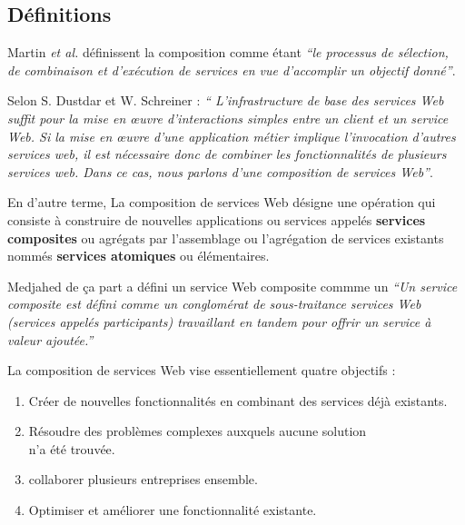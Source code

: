    \subsection{Définitions}
    \label{sec:definitions}

    Martin \emph{et al.} \cite{martin2004owl} définissent
    la composition comme étant \emph{``le processus de sélection, de
      combinaison et d'exécution de services en vue
      d'accomplir un objectif donné''}.

    Selon S. Dustdar et W. Schreiner \cite{dustdar2005survey} :
    \emph{`` L'infrastructure de base des services Web suffit pour la
      mise en œuvre d'interactions simples entre un client et un
      service Web. Si la mise en œuvre d'une application métier
      implique l'invocation d'autres services web, il est nécessaire
      donc de combiner les fonctionnalités de plusieurs services
      web. Dans ce cas, nous parlons d'une composition de services
      Web''}.

    En d'autre terme, La composition de services Web désigne une
    opération qui consiste à construire de nouvelles applications ou
    services appelés \textbf{services composites} ou agrégats par
    l'assemblage ou l'agrégation de services existants nommés
    \textbf{services atomiques} ou élémentaires.

    Medjahed \cite{medjahed2004thesis}de ça part a défini un service
    Web composite commme un \emph{``Un service composite est défini
      comme un conglomérat de sous-traitance services Web (services
      appelés participants) travaillant en tandem pour offrir un
      service à valeur ajoutée.''}

    La composition de services Web vise essentiellement quatre
    objectifs \cite{driss2011approche}:
    \begin{enumerate}
      \item Créer de nouvelles fonctionnalités en combinant des services
        déjà existants.
      \item Résoudre des problèmes complexes auxquels aucune solution\\
        n'a été trouvée.
      \item collaborer plusieurs entreprises ensemble.
      \item Optimiser et améliorer une fonctionnalité existante.
    \end{enumerate}

